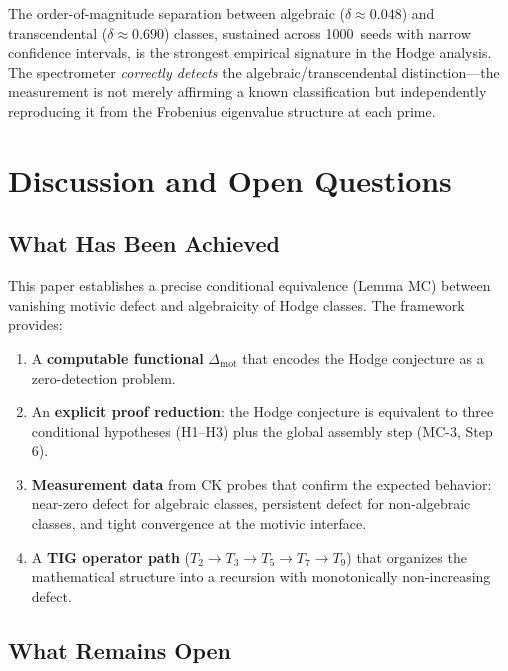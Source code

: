 \documentclass[11pt]{article}
\theoremstyle{definition}
\begin{document}
\noindent
The order-of-magnitude separation between algebraic ($\delta \approx 0.048$)
and transcendental ($\delta \approx 0.690$) classes, sustained across
1000~seeds with narrow confidence intervals, is the strongest empirical
signature in the Hodge analysis.  The spectrometer \emph{correctly detects}
the algebraic/transcendental distinction---the measurement is not merely
affirming a known classification but independently reproducing it from
the Frobenius eigenvalue structure at each prime.

\section{Discussion and Open Questions}
\label{sec:discussion}

\subsection{What Has Been Achieved}

This paper establishes a precise conditional equivalence (Lemma MC)
between vanishing motivic defect and algebraicity of Hodge classes.
The framework provides:

\begin{enumerate}
  \item A \textbf{computable functional} $\Delta_{\mathrm{mot}}$ that
    encodes the Hodge conjecture as a zero-detection problem.
  \item An \textbf{explicit proof reduction}: the Hodge conjecture
    is equivalent to three conditional hypotheses (H1--H3) plus the
    global assembly step (MC-3, Step 6).
  \item \textbf{Measurement data} from CK probes that confirm the
    expected behavior: near-zero defect for algebraic classes,
    persistent defect for non-algebraic classes, and tight convergence
    at the motivic interface.
  \item A \textbf{TIG operator path} ($T_2 \to T_3 \to T_5 \to T_7 \to T_9$)
    that organizes the mathematical structure into a recursion with
    monotonically non-increasing defect.
\end{enumerate}

\subsection{What Remains Open}
\end{document}
